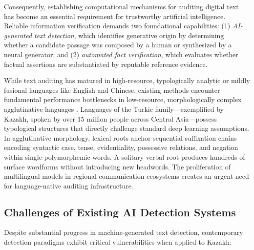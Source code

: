 Consequently, establishing computational mechanisms for auditing digital text has become an essential requirement for trustworthy artificial intelligence. Reliable information verification demands two foundational capabilities: (1) \textit{AI-generated text detection}, which identifies generative origin by determining whether a candidate passage was composed by a human or synthesized by a neural generator; and (2) \textit{automated fact verification}, which evaluates whether factual assertions are substantiated by reputable reference evidence.

While text auditing has matured in high-resource, typologically analytic or mildly fusional languages like English and Chinese, existing methods encounter fundamental performance bottlenecks in low-resource, morphologically complex agglutinative languages \cite{khurana2024subwords, togmanov-etal-2025-kazmmlu}. Languages of the Turkic family---exemplified by Kazakh, spoken by over 15 million people across Central Asia---possess typological structures that directly challenge standard deep learning assumptions. In agglutinative morphology, lexical roots anchor sequential suffixation chains encoding syntactic case, tense, evidentiality, possessive relations, and negation within single polymorphemic words. A solitary verbal root produces hundreds of surface wordforms without introducing new headwords. The proliferation of multilingual models in regional communication ecosystems creates an urgent need for language-native auditing infrastructure.

\subsection{Challenges of Existing AI Detection Systems}
\label{sec:challenges_existing}

Despite substantial progress in machine-generated text detection, contemporary detection paradigms exhibit critical vulnerabilities when applied to Kazakh:

